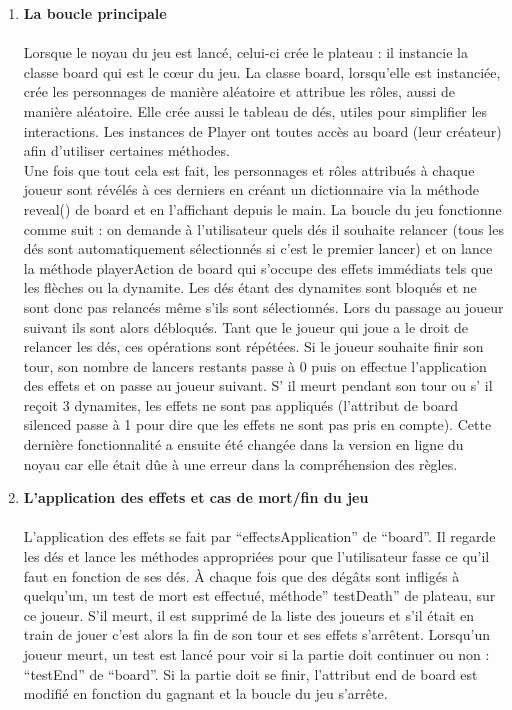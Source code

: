 \documentclass[a4paper,11pt]{article}
\begin{document}
\begin{enumerate}
	\item \textbf{La boucle principale} \\\\
	Lorsque le noyau du jeu est lancé, celui-ci crée le plateau : il instancie la classe board qui est le cœur du jeu. La classe board, lorsqu’elle est instanciée, crée les personnages de manière aléatoire et attribue les rôles, aussi de manière aléatoire. Elle crée aussi le tableau de dés, utiles pour simplifier les interactions. Les instances de Player ont toutes accès au board (leur créateur) afin d’utiliser certaines méthodes.  \\
    Une fois que tout cela est fait, les personnages et rôles attribués à chaque joueur sont révélés à ces derniers en créant un dictionnaire via la méthode reveal() de board et en l’affichant depuis le main. La boucle du jeu fonctionne comme suit : on demande à l’utilisateur quels dés il souhaite relancer (tous les dés sont automatiquement sélectionnés si c’est le premier lancer) et on lance la méthode playerAction de board qui s’occupe des effets immédiats tels que les flèches ou la dynamite. 
    Les dés étant des dynamites sont bloqués et ne sont donc pas relancés même s’ils sont sélectionnés. Lors du passage au joueur suivant ils sont alors débloqués. Tant que le joueur qui joue a le droit de relancer les dés, ces opérations sont répétées. Si le joueur souhaite finir son tour, son nombre de lancers restants passe à 0 puis on effectue l’application des effets et on passe au joueur suivant. 
    S' il meurt pendant son tour ou s' il reçoit 3 dynamites, les effets ne sont pas appliqués (l’attribut de board silenced passe à 1 pour dire que les effets ne sont pas pris en compte). Cette dernière fonctionnalité a ensuite été changée dans la version en ligne du noyau car elle était dûe à une erreur dans la compréhension des règles. \\

\newpage

	\item \textbf{L’application des effets et cas de mort/fin du jeu} \\\\
	L’application des effets se fait par “effectsApplication” de “board”. Il regarde les dés et lance les méthodes appropriées pour que l’utilisateur fasse ce qu’il faut en fonction de ses dés. À chaque fois que des dégâts sont infligés à quelqu’un, un test de mort est effectué, méthode” testDeath” de plateau, sur ce joueur. S’il meurt, il est supprimé de la liste des joueurs et s’il était en train de jouer c’est alors la fin de son tour et ses effets s’arrêtent. Lorsqu’un joueur meurt, un test est lancé pour voir si la partie doit continuer ou non : “testEnd” de “board”. Si la partie doit se finir, l’attribut end de board est modifié en fonction du gagnant et la boucle du jeu s’arrête. \\




\end{enumerate}
\end{document}
